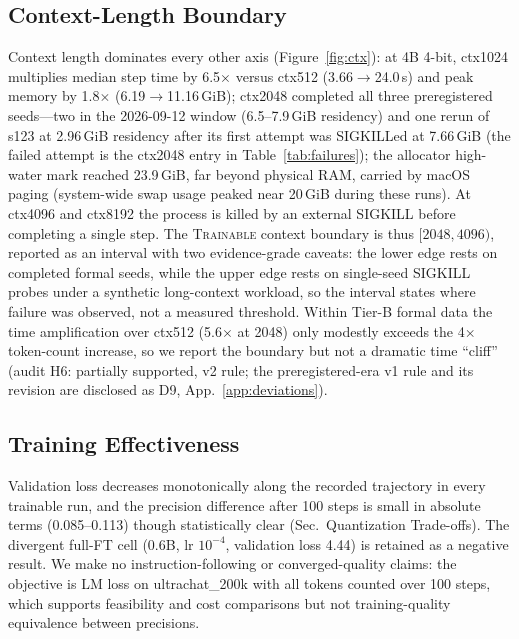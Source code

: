 \documentclass[10pt,twocolumn]{article}
\newcommand{\trainable}{\textsc{Trainable}\xspace}
\begin{document}



\subsection{Context-Length Boundary}
Context length dominates every other axis (Figure~\ref{fig:ctx}): at 4B
4-bit, ctx1024 multiplies median step time by 6.5$\times$ versus ctx512
(3.66$\rightarrow$24.0\,s) and peak memory by 1.8$\times$
(6.19$\rightarrow$11.16\,GiB); ctx2048 completed all three
preregistered seeds---two in the 2026-09-12 window (6.5--7.9\,GiB
residency) and one rerun of s123 at 2.96\,GiB residency after its first
attempt was SIGKILLed at 7.66\,GiB (the failed attempt is the ctx2048
entry in Table~\ref{tab:failures}); the allocator high-water mark
reached 23.9\,GiB, far beyond physical RAM, carried by macOS paging
(system-wide swap usage peaked near 20\,GiB during these runs). At
ctx4096 and ctx8192 the process is killed by an external SIGKILL
before completing a single step. The \trainable context boundary is
thus $[2048,4096)$, reported as an interval with two evidence-grade
caveats: the lower edge rests on completed formal seeds, while the
upper edge rests on single-seed SIGKILL probes under a synthetic
long-context workload, so the interval states where failure was
observed, not a measured threshold. Within Tier-B formal data the time
amplification over ctx512 (5.6$\times$ at 2048) only modestly exceeds
the 4$\times$ token-count increase, so we report the boundary but not a
dramatic time ``cliff'' (audit H6: partially supported, v2 rule; the
preregistered-era v1 rule and its revision are disclosed as D9,
App.~\ref{app:deviations}).

\subsection{Training Effectiveness}
\label{sec:effectiveness}
Validation loss decreases monotonically along the recorded trajectory
in every trainable run, and the precision difference after 100 steps is
small in absolute terms (0.085--0.113) though statistically clear
(Sec.~Quantization Trade-offs). The divergent full-FT cell (0.6B,
lr $10^{-4}$, validation loss 4.44) is retained as a negative result. We
make no instruction-following or converged-quality claims: the objective
is LM loss on ultrachat\_200k with all tokens counted over 100 steps,
which supports feasibility and cost comparisons but not
training-quality equivalence between precisions.
\end{document}
